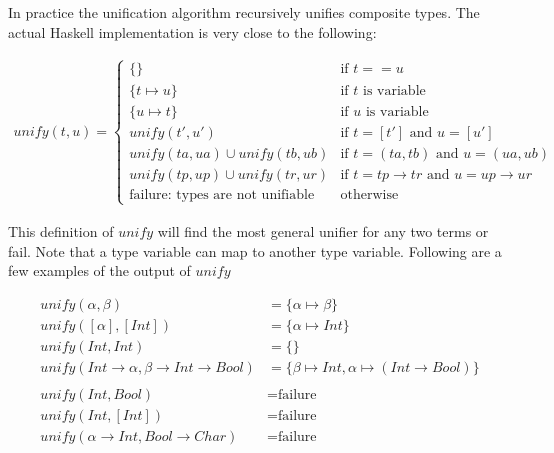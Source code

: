 In practice the unification algorithm recursively unifies composite types. The actual Haskell implementation is very close to the following:

\begin{align*}
unify(t, u) = \begin{cases}
  \{\}                                    & \mbox{if } t == u                                    \\
  \{ t \mapsto u \}                       & \mbox{if } t \mbox{ is variable}                     \\
  \{ u \mapsto t \}                       & \mbox{if } u \mbox{ is variable}                     \\
  unify(t', u')                           & \mbox{if } t = [t'] \mbox{ and } u = [u']            \\
  unify(ta, ua) \cup unify(tb, ub)        & \mbox{if } t = (ta, tb) \mbox{ and } u = (ua, ub)    \\
  unify(tp, up) \cup unify(tr, ur)        & \mbox{if } t = tp \to tr \mbox{ and } u = up \to ur \\
  \text{failure: types are not unifiable} & \mbox{otherwise}
\end{cases}
\end{align*}

This definition of $unify$ will find the most general unifier for any two terms or fail. Note that a type variable can map to another type variable. Following are a few examples of the output of $unify$

\begin{align*}
unify(\alpha, \beta)                          & = \{ \alpha \mapsto \beta \}                             \\
unify([\alpha], [Int])                        & = \{ \alpha \mapsto Int \}                               \\
unify(Int, Int)                               & = \{  \}                                                 \\
unify(Int \to \alpha, \beta \to Int \to Bool) & = \{ \beta \mapsto Int, \alpha \mapsto (Int \to Bool) \} \\
                                                                                                         \\
unify(Int, Bool)                              & = \text{failure}                                         \\
unify(Int, [Int])                             & = \text{failure}                                         \\
unify(\alpha \to Int, Bool \to Char)          & = \text{failure}                                         \\
\end{align*}


